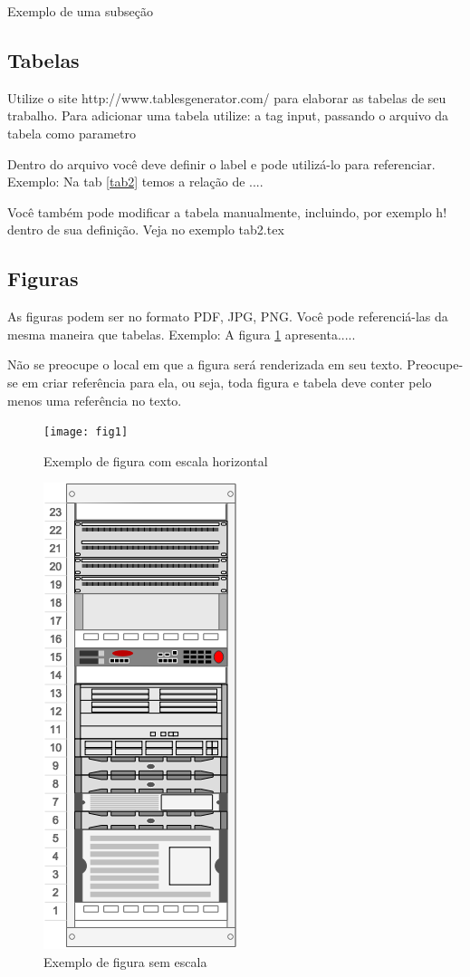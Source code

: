\documentclass[	DIV=calc,%
							paper=a4,%
							fontsize=12pt,%
							onecolumn]{scrartcl}	 					%
\begin{document}
Exemplo de uma subseção

\subsection{Tabelas}

Utilize o site http://www.tablesgenerator.com/ para elaborar as tabelas de seu trabalho.
Para adicionar uma tabela utilize: a tag input, passando o arquivo da tabela como parametro



Dentro do arquivo você deve definir o label e pode utilizá-lo para referenciar. Exemplo:
Na tab \ref{tab2} temos a relação de ....


Você também pode modificar a tabela manualmente, incluindo, por exemplo h! dentro de sua definição. Veja no exemplo tab2.tex

\subsection{Figuras}

As figuras podem ser no formato PDF, JPG, PNG. Você pode referenciá-las da mesma maneira que tabelas. Exemplo: A figura \ref{fig1} apresenta.....

Não se preocupe o local em que a figura será renderizada em seu texto. Preocupe-se em criar referência para ela, ou seja, toda figura e tabela deve conter pelo menos uma referência no texto.

\begin{figure}
\centering
\texttt{[image: fig1]}
\caption{Exemplo de figura com escala horizontal}
\label{fig1}
\end{figure}


\begin{figure}
	\centering
	\includegraphics[]{fig2}
	\caption{Exemplo de figura sem escala}
	\label{fig2}
\end{figure}
\end{document}
